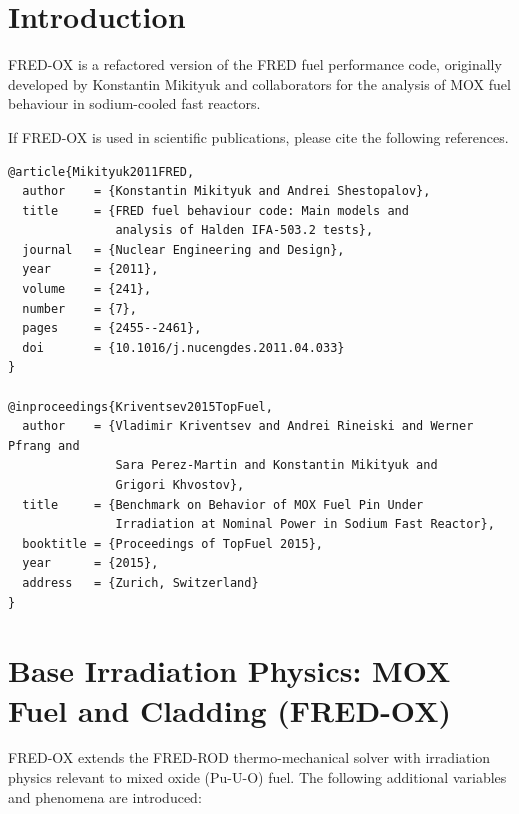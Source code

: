\begin{refsection}

\section{Introduction}

FRED-OX is a refactored version of the FRED fuel performance code, originally developed by Konstantin Mikityuk and collaborators for the analysis of MOX fuel behaviour in sodium-cooled fast reactors.

If FRED-OX is used in scientific publications, please cite the following references.

\begin{verbatim}
@article{Mikityuk2011FRED,
  author    = {Konstantin Mikityuk and Andrei Shestopalov},
  title     = {FRED fuel behaviour code: Main models and
               analysis of Halden IFA-503.2 tests},
  journal   = {Nuclear Engineering and Design},
  year      = {2011},
  volume    = {241},
  number    = {7},
  pages     = {2455--2461},
  doi       = {10.1016/j.nucengdes.2011.04.033}
}

@inproceedings{Kriventsev2015TopFuel,
  author    = {Vladimir Kriventsev and Andrei Rineiski and Werner Pfrang and
               Sara Perez-Martin and Konstantin Mikityuk and
               Grigori Khvostov},
  title     = {Benchmark on Behavior of MOX Fuel Pin Under
               Irradiation at Nominal Power in Sodium Fast Reactor},
  booktitle = {Proceedings of TopFuel 2015},
  year      = {2015},
  address   = {Zurich, Switzerland}
}
\end{verbatim}

\section{Base Irradiation Physics: MOX Fuel and Cladding (FRED-OX)}
\label{sec:fred_ox}

FRED-OX extends the FRED-ROD thermo-mechanical solver with irradiation physics relevant to mixed oxide (Pu-U-O) fuel. The following additional variables and phenomena are introduced:


\end{refsection}

